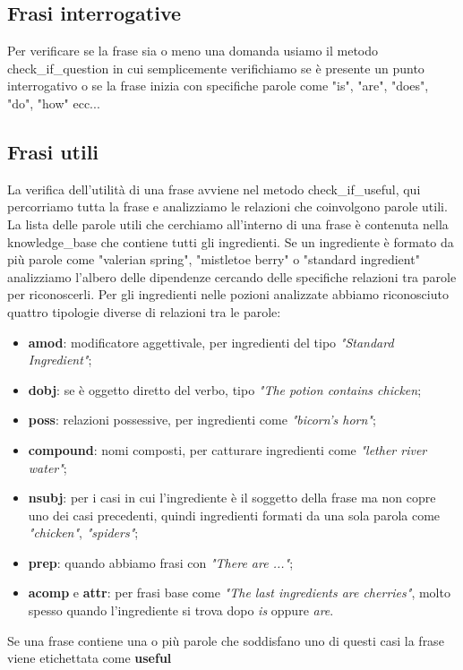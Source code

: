 \subsection{Frasi interrogative}
Per verificare se la frase sia o meno una domanda usiamo il metodo check\_if\_question in cui semplicemente verifichiamo se è presente un punto interrogativo o se la frase inizia con specifiche parole come "is", "are", "does", "do", "how" ecc...
\subsection{Frasi utili}
La verifica dell'utilità di una frase avviene nel metodo check\_if\_useful, qui percorriamo tutta la frase e analizziamo le relazioni che coinvolgono parole utili. La lista delle parole utili che cerchiamo all'interno di una frase è contenuta nella knowledge\_base che contiene tutti gli ingredienti. Se un ingrediente è formato da più parole come "valerian spring", "mistletoe berry" o  "standard ingredient" analizziamo l'albero delle dipendenze cercando delle specifiche relazioni tra parole per riconoscerli. Per gli ingredienti nelle pozioni analizzate abbiamo riconosciuto quattro tipologie diverse di relazioni tra le parole:
\begin{itemize}
    \item \textbf{amod}: modificatore aggettivale, per ingredienti del tipo \textit{"Standard Ingredient"};
    \item \textbf{dobj}: se è oggetto diretto del verbo, tipo \textit{"The potion contains chicken};
    \item \textbf{poss}: relazioni possessive, per ingredienti come \textit{"bicorn's horn"};
    \item \textbf{compound}: nomi composti, per catturare ingredienti come \textit{"lether river water"};
    \item \textbf{nsubj}: per i casi in cui l'ingrediente è il soggetto della frase ma non copre uno dei casi precedenti, quindi ingredienti formati da una sola parola come \textit{"chicken"}, \textit{"spiders"};
    \item \textbf{prep}: quando abbiamo frasi con \textit{"There are ..."};
    \item \textbf{acomp} e \textbf{attr}: per frasi base come \textit{"The last ingredients are cherries"}, molto spesso quando l'ingrediente si trova dopo \textit{is} oppure \textit{are}.
\end{itemize}
Se una frase contiene una o più parole che soddisfano uno di questi casi la frase viene etichettata come \textbf{useful}

